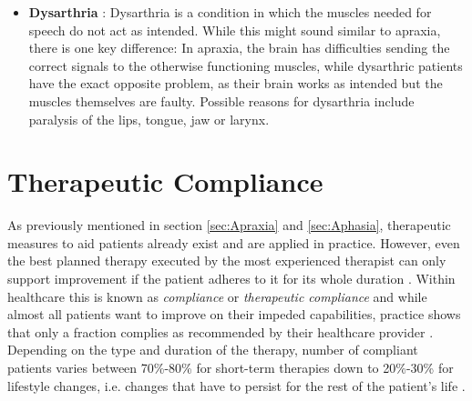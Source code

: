 \documentclass[draft,final]{vutinfth} %
\begin{document}
\begin{itemize}
\item \textbf{Dysarthria} \cite{balaji2015speech}: Dysarthria is a condition in which the muscles needed for speech do not act as intended. While this might sound similar to apraxia, there is one key difference: In apraxia, the brain has difficulties sending the correct signals to the otherwise functioning muscles, while dysarthric patients have the exact opposite problem, as their brain works as intended but the muscles themselves are faulty. Possible reasons for dysarthria include paralysis of the lips, tongue, jaw or larynx.
\end{itemize}

\section{Therapeutic Compliance}
As previously mentioned in section \ref{sec:Apraxia} and \ref{sec:Aphasia}, therapeutic measures to aid patients already exist and are applied in practice. However, even the best planned therapy executed by the most experienced therapist can only support improvement if the patient adheres to it for its whole duration \cite{dusing2001adverse}. Within healthcare this is known as \emph{compliance} or \emph{therapeutic compliance} and while almost all patients want to improve on their impeded capabilities, practice shows that only a fraction complies as recommended by their healthcare provider \cite{jin2008factors}. Depending on the type and duration of the therapy, number of compliant patients varies between 70\%-80\% for short-term therapies down to 20\%-30\% for lifestyle changes, i.e. changes that have to persist for the rest of the patient's life \cite{jin2008factors}.
\end{document}
